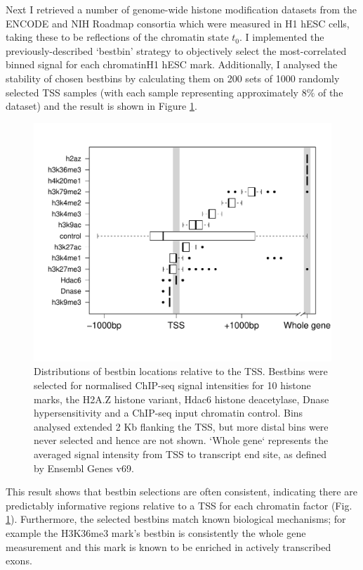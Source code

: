 \documentclass[a4paper,11pt,oneside]{book}
\begin{document}
Next I retrieved a number of genome-wide histone modification datasets
from the ENCODE and
NIH Roadmap consortia which were measured in H1 hESC cells, taking these to be
reflections of the chromatin state $t_0$. I implemented the
previously-described `bestbin' strategy\cite{Dong2012} to objectively
select the most-correlated binned signal for each chromatinH1 hESC
mark. Additionally, I analysed the stability of chosen bestbins by
calculating them on 200 sets of 1000 randomly selected TSS samples (with each sample
representing approximately $8\%$ of the dataset) and the result is
shown in Figure \ref{fig:bestbin}. \\

\begin{figure}
\begin{center} 
\includegraphics[width=.9\textwidth]{figs/bestbinSummary.pdf}
\captionsetup{width=\textwidth}
\caption{Distributions of bestbin locations relative to the
  TSS. Bestbins were selected for normalised ChIP-seq
  signal intensities for 10 histone marks, the
  H2A.Z histone variant, Hdac6 histone deacetylase, Dnase
  hypersensitivity and a ChIP-seq input chromatin control. Bins analysed
  extended 2 Kb flanking the TSS, but more distal bins were
  never selected and hence are not shown. `Whole gene` represents the
  averaged signal intensity from TSS to transcript end site, as
  defined by Ensembl Genes v69.
}\label{fig:bestbin}
\end{center}
\end{figure} 

This result shows that bestbin selections are often consistent, indicating there are predictably informative regions
relative to a TSS for each chromatin factor (Fig. \ref{fig:bestbin}). Furthermore, the selected
bestbins match known biological mechanisms; for example the H3K36me3
mark's bestbin is consistently the whole gene measurement and this
mark is known to be enriched in actively transcribed
exons.\cite{Tippmann2012, Kolasinska-Zwierz2009, Schaft2003} \\
\end{document}

